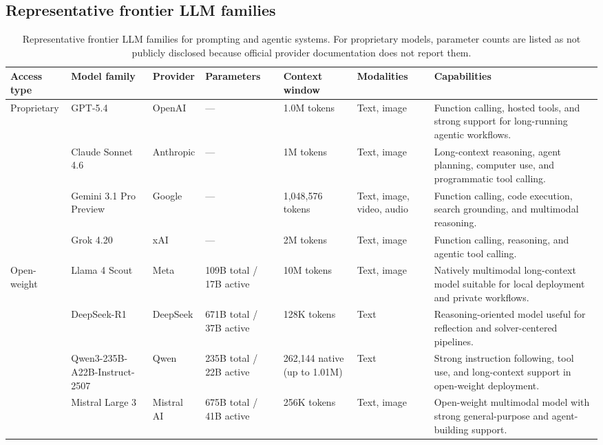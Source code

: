 \documentclass[journal,onecolumn]{IEEEtran} %
\begin{document}
\subsection{Representative frontier LLM families}
\begin{table}[tb]
\centering
\footnotesize
\caption{{Representative frontier LLM families for prompting and agentic systems.
For proprietary models, parameter counts are listed as not publicly disclosed because official provider documentation does not report them.}}
\label{tab:llm_families}
\renewcommand{\arraystretch}{1.15}
\setlength{\tabcolsep}{4pt}
\begin{tabularx}{\textwidth}{p{1.4cm} p{2cm} p{1.5cm} p{1.5cm} p{2cm} p{2.2cm} X}
\toprule
\textbf{Access type} & \textbf{Model family} & \textbf{Provider} & \textbf{Parameters} & \textbf{Context window} & \textbf{Modalities} & \textbf{Capabilities} \\
\midrule

\multirow{4}{*}{\parbox{1.5cm}{\centering Proprietary}}
& GPT-5.4 & OpenAI & --- & 1.0M tokens & Text, image & Function calling, hosted tools, and strong support for long-running agentic workflows. \\
& Claude Sonnet 4.6 & Anthropic & --- & 1M tokens & Text, image & Long-context reasoning, agent planning, computer use, and programmatic tool calling. \\
& Gemini 3.1 Pro Preview & Google & --- & 1,048,576 tokens & Text, image, video, audio & Function calling, code execution, search grounding, and multimodal reasoning. \\
& Grok 4.20 & xAI & --- & 2M tokens & Text, image & Function calling, reasoning, and agentic tool calling. \\
\midrule

\multirow{4}{*}{\parbox{1.5cm}{\centering Open-weight}}
& Llama 4 Scout & Meta & 109B total / 17B active & 10M tokens & Text, image & Natively multimodal long-context model suitable for local deployment and private workflows. \\
& DeepSeek-R1 & DeepSeek & 671B total / 37B active & 128K tokens & Text & Reasoning-oriented model useful for reflection and solver-centered pipelines. \\
& Qwen3-235B-A22B-Instruct-2507 & Qwen & 235B total / 22B active & 262,144 native (up to 1.01M) & Text & Strong instruction following, tool use, and long-context support in open-weight deployment. \\
& Mistral Large 3 & Mistral AI & 675B total / 41B active & 256K tokens & Text, image & Open-weight multimodal model with strong general-purpose and agent-building support. \\
\bottomrule
\end{tabularx}
\end{table}
\end{document}
